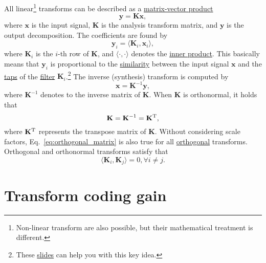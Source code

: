 All linear\footnote{Non-linear transform are also possible, but their
mathematical treatment is different.} transforms can be
described as a
\href{https://en.wikipedia.org/wiki/Matrix_multiplication}{matrix-vector
  product}~\cite{strang4linear}
\begin{equation}
  \mathbf{y} = \mathbf{K}\mathbf{x},
  \label{eq:forward_transform_matrix_form}
\end{equation}
where $\mathbf{x}$ is the input signal, $\mathbf{K}$ is the analysis
transform matrix, and $\mathbf{y}$ is the output decomposition. The
coefficients are found by
\begin{equation}
  {\mathbf{y}}_i = \langle {\mathbf{K}}_i, {\mathbf{x}}_i\rangle,
\end{equation}
where ${\mathbf{K}}_i$ is the $i$-th row of $\mathbf{K}$, and
$\langle\cdot,\cdot\rangle$ denotes the
\href{https://mathworld.wolfram.com/InnerProduct.html}{inner
  product}. This basically means that ${\mathbf{y}}_i$ is proportional to the
\href{https://en.wikipedia.org/wiki/Similarity_(geometry)}{similarity}
between the input signal $\mathbf{x}$ and the
\href{https://en.wikipedia.org/wiki/Finite_impulse_response}{taps} of
the \href{https://en.wikipedia.org/wiki/Digital_filter}{filter}
${\mathbf{K}}_i$.\footnote{These
\href{https://cseweb.ucsd.edu/classes/fa17/cse166-a/lec13.pdf}{slides}
can help you with this key idea.} The inverse (synthesis) transform is
computed by
\begin{equation}
  \mathbf{x} = {\mathbf{K}}^{-1}\mathbf{y},
  \label{eq:backward_transform_matrix_form}
\end{equation}
where ${\mathbf{K}}^{-1}$ denotes to the inverse matrix of
$\mathbf{K}$. When ${\mathbf K}$ is orthonormal, it holds that
\begin{equation}
  \mathbf{K}={\mathbf{K}}^{-1}={\mathbf{K}}^{\text T},
  \label{eq:orthogonal_matrix}
\end{equation}
where ${\mathbf{K}}^{\text T}$ represents the transpose matrix of
$\mathbf{K}$. Without considering scale factors,
Eq.~\ref{eq:orthogonal_matrix} is also true for all
\href{https://en.wikipedia.org/wiki/Orthogonality}{orthogonal}
transforms. Orthogonal and orthonormal transforms satisfy that
\begin{equation}
  \langle {\mathbf{K}}_i, {\mathbf{K}}_j\rangle = 0, \forall i\neq j.
\end{equation}


\section{Transform coding gain}

